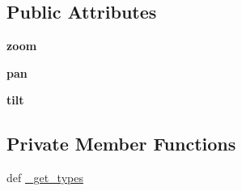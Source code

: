 \subsection*{\-Public \-Attributes}
\begin{DoxyCompactItemize}
\item 
\hypertarget{class_c_i_t_i_u_s___control___communication_1_1msg_1_1__msg__front_camera_info_1_1msg__front_camera_info_a32b1a0aaa6569b6cd9b516aab6a0b6ad}{{\bfseries zoom}}\label{class_c_i_t_i_u_s___control___communication_1_1msg_1_1__msg__front_camera_info_1_1msg__front_camera_info_a32b1a0aaa6569b6cd9b516aab6a0b6ad}

\item 
\hypertarget{class_c_i_t_i_u_s___control___communication_1_1msg_1_1__msg__front_camera_info_1_1msg__front_camera_info_a5c7c82f623a0fd747340a3b2b1eeda12}{{\bfseries pan}}\label{class_c_i_t_i_u_s___control___communication_1_1msg_1_1__msg__front_camera_info_1_1msg__front_camera_info_a5c7c82f623a0fd747340a3b2b1eeda12}

\item 
\hypertarget{class_c_i_t_i_u_s___control___communication_1_1msg_1_1__msg__front_camera_info_1_1msg__front_camera_info_a587caf22502ddbfe7edceef672d1fe20}{{\bfseries tilt}}\label{class_c_i_t_i_u_s___control___communication_1_1msg_1_1__msg__front_camera_info_1_1msg__front_camera_info_a587caf22502ddbfe7edceef672d1fe20}

\end{DoxyCompactItemize}
\subsection*{\-Private \-Member \-Functions}
\begin{DoxyCompactItemize}
\item 
def \hyperlink{class_c_i_t_i_u_s___control___communication_1_1msg_1_1__msg__front_camera_info_1_1msg__front_camera_info_aa0d9d15fac8efe6f7fc93c61cc2d5c7e}{\-\_\-get\-\_\-types}
\end{DoxyCompactItemize}
